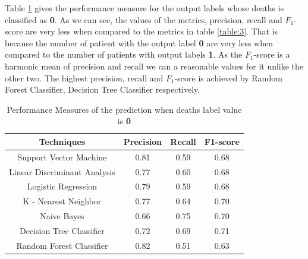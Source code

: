 \documentclass[conference]{IEEEtran}
\begin{document}
Table \ref{table:2} gives the performance measure for the output labels whose deaths is classified as \textbf{0}. As we can see, the values of the metrics, precision, recall and $F_1$-score are very less when compared to the metrics in table \ref{table:3}. That is because the number of patient with the output label \textbf{0} are very less when compared to the number of patients with output labels \textbf{1}. As the  $F_1$-score is a harmonic mean of precision and recall we can a reasonable values for it unlike the other two. The highest precision, recall and $F_1$-score is achieved by Random Forest Classifier, Decision Tree Classifier respectively. 
\begin{table}[H]
\centering
 \begin{tabular}{|c| c c c|} 
 \hline
 Techniques  & Precision & Recall & F1-score \\ [0.5ex] 
 \hline
 Support Vector Machine & 0.81 & 0.59 & 0.68 \\ 
 \hline
 Linear Discriminant Analysis & 0.77 & 0.60 & 0.68\\
 \hline
 Logistic Regression & 0.79 & 0.59 & 0.68\\
 \hline
 K - Nearest Neighbor & 0.77 & 0.64 & 0.70\\
 \hline
 Naive Bayes & 0.66 & 0.75 & 0.70\\  
 \hline
 Decision Tree Classifier & 0.72 & 0.69 & 0.71 \\
 \hline
 Random Forest Classifier & 0.82 & 0.51 & 0.63  \\[0.75ex] 
 \hline
\end{tabular}
\vspace*{0.25cm}
\caption{Performance Measures of the prediction when deaths label value is \textbf{0}}
\label{table:2}
\end{table}
\end{document}
